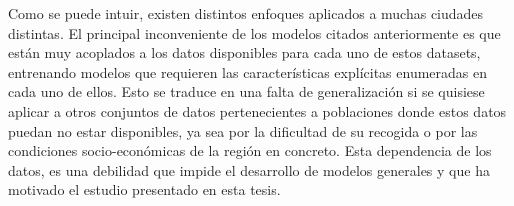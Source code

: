 \documentclass{uathesis-es}
\begin{document}
	Como se puede intuir, existen distintos enfoques aplicados a muchas ciudades distintas. El principal inconveniente de los modelos citados anteriormente es que están muy acoplados a los datos disponibles para cada uno de estos datasets, entrenando modelos que requieren las características explícitas enumeradas en cada uno de ellos. Esto se traduce en una falta de generalización si se quisiese aplicar a otros conjuntos de datos pertenecientes a poblaciones donde estos datos puedan no estar disponibles, ya sea por la dificultad de su recogida o por las condiciones socio-económicas de la región en concreto. Esta dependencia de los datos, es una debilidad que impide el desarrollo de modelos generales y que ha motivado el estudio presentado en esta tesis.
	
	
	
	
	
	
	
	
	
	
	
	
	
\end{document}
